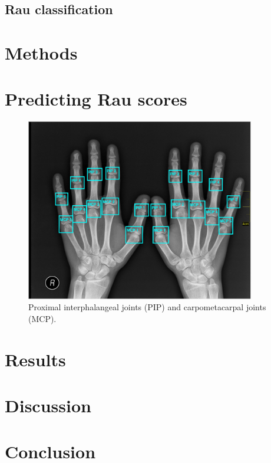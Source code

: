 \documentclass[12pt]{article}
\begin{document}
\subsection{Rau classification}
\label{subsec:rau}

\section{Methods}
\label{sec:methods}


\section{Predicting Rau scores}





\begin{figure}
\includegraphics[width=10cm]{joints}	
\caption{Proximal interphalangeal joints (PIP) and carpometacarpal joints (MCP).}
\label{fig:joints}
\end{figure}


\section{Results}


\section{Discussion}


\section{Conclusion}



\newpage
\printbibliography

\newpage
\listoffigures
\end{document}
